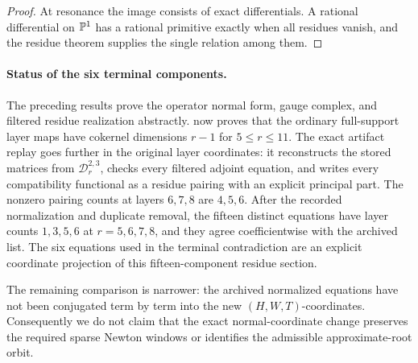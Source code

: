 \begin{proof}
At resonance the image consists of exact differentials.  A rational
differential on \(\mathbb P^1\) has a rational primitive exactly when all residues
vanish, and the residue theorem supplies the single relation among them.
\end{proof}

\paragraph{Status of the six terminal components.}
The preceding results prove the operator normal form, gauge complex, and
filtered residue realization abstractly.
 now proves that the ordinary full-support
layer maps have cokernel dimensions \(r-1\) for \(5\le r\le11\).
The exact artifact replay goes further in the original layer coordinates:
it reconstructs the stored matrices from
\(\mathscr D_r^{2,3}\), checks every filtered adjoint equation, and writes
every compatibility functional as a residue pairing with an explicit
principal part.  The nonzero pairing counts at layers \(6,7,8\) are
\(4,5,6\).  After the recorded normalization and duplicate removal, the
fifteen distinct equations have layer counts \(1,3,5,6\) at
\(r=5,6,7,8\), and they agree coefficientwise with the archived list.
The six equations used in the terminal contradiction are an explicit
coordinate projection of this fifteen-component residue section.

The remaining comparison is narrower: the archived normalized equations
have not been conjugated term by term into the new \((H,W,T)\)-coordinates.
Consequently we do not claim that the exact normal-coordinate change
preserves the required sparse Newton windows or identifies the admissible
approximate-root orbit.
